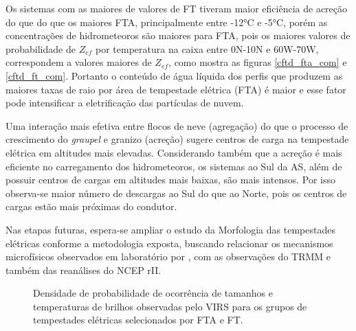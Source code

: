 Os sistemas com as maiores de valores de FT tiveram maior eficiência de acreção do que do que os maiores FTA, principalmente entre -12°C e -5°C, porém as concentrações de hidrometeoros são maiores para FTA, pois os maiores valores de probabilidade de $Z_{ef}$ por temperatura na caixa entre 0N-10N e 60W-70W, correspondem a valores maiores de $Z_{ef}$, como mostra as figuras \ref{cftd_fta_com} e \ref{cftd_ft_com}. Portanto o conteúdo de água líquida dos perfis que produzem as maiores taxas de raio por área de tempestade elétrica (FTA) é maior e esse fator pode intensificar a eletrificação das partículas de nuvem.

Uma interação mais efetiva entre flocos de neve (agregação) do que o processo de crescimento do \textit{graupel} e granizo (acreção) sugere centros de carga na tempestade elétrica em altitudes mais elevadas. Considerando também que a acreção é mais eficiente no carregamento dos hidrometeoros, os sistemas ao Sul da AS, além de possuir centros de cargas em altitudes mais baixas, são mais intensos. Por isso observa-se maior número de descargas ao Sul do que ao Norte, pois os centros de cargas estão mais próximas do condutor.

Nas etapas futuras, espera-se ampliar o estudo da Morfologia das tempestades elétricas conforme a metodologia exposta, buscando relacionar os mecanismos microfísicos observados em laboratório por , com as observações do TRMM e também das reanálises do NCEP rII.



\begin{figure}
\caption{Densidade de probabilidade de ocorrência de tamanhos e temperaturas de brilhos observadas pelo VIRS para os grupos de tempestades elétricas selecionados por FTA e FT.}
\label{tam}
\end{figure}

